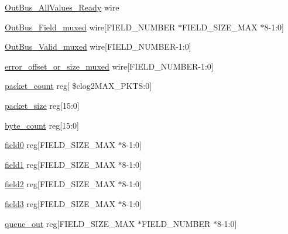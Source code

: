 \begin{DoxyCompactItemize}
\item 
\mbox{\hyperlink{enumpacket__parser__top__tb_a5dd0c370f9f3878f3cad8cebe29247e7}{Out\+Bus\+\_\+\+All\+Values\+\_\+\+Ready}} wire
\item 
\mbox{\hyperlink{enumpacket__parser__top__tb_a94de2bf629795d3141982ea31f81b022}{Out\+Bus\+\_\+\+Field\+\_\+muxed}} wire\mbox{[}F\+I\+E\+L\+D\+\_\+\+N\+U\+M\+B\+ER $\ast$F\+I\+E\+L\+D\+\_\+\+S\+I\+Z\+E\+\_\+\+M\+AX $\ast$8-\/1\+:0\mbox{]}
\item 
\mbox{\hyperlink{enumpacket__parser__top__tb_a8a933d6ad6c7c73fcd484ff507756e4d}{Out\+Bus\+\_\+\+Valid\+\_\+muxed}} wire\mbox{[}F\+I\+E\+L\+D\+\_\+\+N\+U\+M\+B\+ER-\/1\+:0\mbox{]}
\item 
\mbox{\hyperlink{enumpacket__parser__top__tb_ac4fa1b2e273138ab1b8386d1ac1dbc86}{error\+\_\+offset\+\_\+or\+\_\+size\+\_\+muxed}} wire\mbox{[}F\+I\+E\+L\+D\+\_\+\+N\+U\+M\+B\+ER-\/1\+:0\mbox{]}
\item 
\mbox{\hyperlink{enumpacket__parser__top__tb_a9228d47b399d20a20bed985c62c33268}{packet\+\_\+count}} reg\mbox{[} \$clog2\+M\+A\+X\+\_\+\+P\+K\+T\+S\+:0\mbox{]}
\item 
\mbox{\hyperlink{enumpacket__parser__top__tb_a0bf2ce1358b7e41a0b58a5b71b83274b}{packet\+\_\+size}} reg\mbox{[}15\+:0\mbox{]}
\item 
\mbox{\hyperlink{enumpacket__parser__top__tb_a3636615f10afd3d96c9b903a6ff17cab}{byte\+\_\+count}} reg\mbox{[}15\+:0\mbox{]}
\item 
\mbox{\hyperlink{enumpacket__parser__top__tb_a3edfc8715a60a7f03f7d12062c506e65}{field0}} reg\mbox{[}F\+I\+E\+L\+D\+\_\+\+S\+I\+Z\+E\+\_\+\+M\+AX $\ast$8-\/1\+:0\mbox{]}
\item 
\mbox{\hyperlink{enumpacket__parser__top__tb_a1c1ca0d195a8135b794463c2e1f2cf29}{field1}} reg\mbox{[}F\+I\+E\+L\+D\+\_\+\+S\+I\+Z\+E\+\_\+\+M\+AX $\ast$8-\/1\+:0\mbox{]}
\item 
\mbox{\hyperlink{enumpacket__parser__top__tb_ae5d6f0395c77f79679c1978a52202523}{field2}} reg\mbox{[}F\+I\+E\+L\+D\+\_\+\+S\+I\+Z\+E\+\_\+\+M\+AX $\ast$8-\/1\+:0\mbox{]}
\item 
\mbox{\hyperlink{enumpacket__parser__top__tb_a26ba4936dab335ee72f67aee1f08752d}{field3}} reg\mbox{[}F\+I\+E\+L\+D\+\_\+\+S\+I\+Z\+E\+\_\+\+M\+AX $\ast$8-\/1\+:0\mbox{]}
\item 
\mbox{\hyperlink{enumpacket__parser__top__tb_a0033d875cdf5314b3a76fd2d7ab13b2c}{queue\+\_\+out}} reg\mbox{[}F\+I\+E\+L\+D\+\_\+\+S\+I\+Z\+E\+\_\+\+M\+AX $\ast$F\+I\+E\+L\+D\+\_\+\+N\+U\+M\+B\+ER $\ast$8-\/1\+:0\mbox{]}

\end{DoxyCompactItemize}
